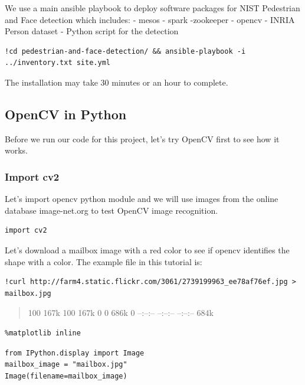 We use a main ansible playbook to deploy software packages for NIST
Pedestrian and Face detection which includes: - mesos - spark -zookeeper
- opencv - INRIA Person dataset - Python script for the detection

\begin{verbatim}
!cd pedestrian-and-face-detection/ && ansible-playbook -i ../inventory.txt site.yml
\end{verbatim}

The installation may take 30 minutes or an hour to complete.

\subsection{OpenCV in Python}\label{opencv-in-python}

Before we run our code for this project, let's try OpenCV first to see
how it works.

\subsubsection{Import cv2}\label{import-cv2}

Let's import opencv python module and we will use images from the online
database image-net.org to test OpenCV image recognition.

\begin{verbatim}
import cv2
\end{verbatim}

Let's download a mailbox image with a red color to see if opencv
identifies the shape with a color. The example file in this tutorial is:

\begin{verbatim}
!curl http://farm4.static.flickr.com/3061/2739199963_ee78af76ef.jpg > mailbox.jpg
\end{verbatim}

\begin{quote}
100 167k 100 167k 0 0 686k 0 --:--:-- --:--:-- --:--:-- 684k
\end{quote}

\begin{verbatim}
%matplotlib inline
\end{verbatim}

\begin{verbatim}
from IPython.display import Image
mailbox_image = "mailbox.jpg"
Image(filename=mailbox_image)
\end{verbatim}

